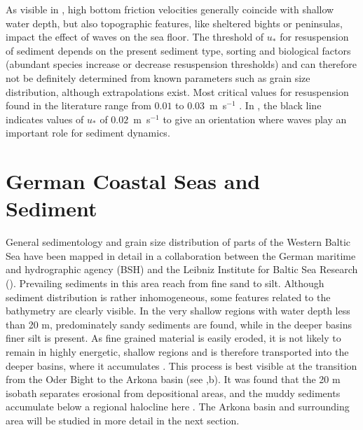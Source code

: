 As visible in , high bottom friction velocities generally 
coincide with shallow water depth, but also topographic features, like 
sheltered bights or peninsulas, impact the effect of waves on the sea floor. 
The threshold of $u_\ast$ for resuspension of sediment depends on the present 
sediment type, sorting and biological factors (abundant species increase or 
decrease resuspension thresholds) and can therefore not be definitely determined 
from known parameters such as grain size distribution, although extrapolations 
exist. Most critical 
values for resuspension found in the literature range from $0.01$ to 
$0.03$~m~s$^{-1}$ \citep[][]{jonsson2004}. In , the black line 
indicates values of $u_\ast$ of $0.02$~m~s$^{-1}$ to give an orientation where 
waves play an important role for sediment dynamics.
% 
\FloatBarrier
\section{German Coastal Seas and Sediment}

General sedimentology and grain size distribution of parts of the Western 
Baltic Sea have 
been mapped in detail in a collaboration between the German maritime and 
hydrographic agency (BSH) and the Leibniz Institute for Baltic Sea Research 
(). Prevailing sediments in this area reach from 
fine sand to silt. Although sediment distribution is rather inhomogeneous, some 
features related to the bathymetry are clearly visible. In the very shallow 
regions with water depth less than 20 m, predominately sandy sediments are 
found, while in the deeper basins finer silt is present.
As fine grained material is easily eroded, it is not likely to remain in highly 
energetic, shallow regions and is therefore transported into the deeper basins, 
where 
it accumulates \citep[][]{basys1}. This process is best visible at the 
transition from the Oder Bight to the Arkona basin (see ,b). 
It was found that the 20 m isobath separates erosional from depositional areas, 
and the muddy sediments accumulate below a regional halocline here 
\citep[][]{basys2}. The Arkona basin and surrounding area will be studied in 
more detail in the next section.

